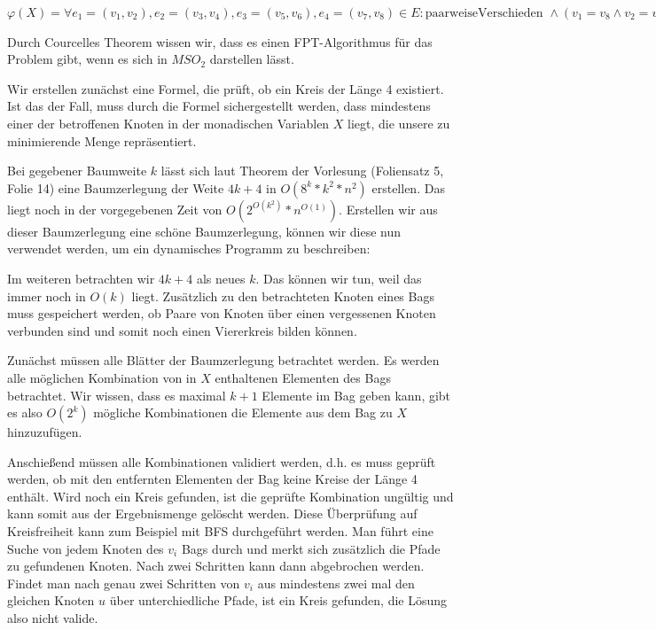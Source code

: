 

\DeclareMathOperator{\vc}{vc}





\subexercise

$\varphi(X) = \forall e_1 = (v_1, v_2), e_2 = (v_3, v_4), e_3 = (v_5, v_6), e_4 = (v_7, v_8) \in E \colon \text{paarweiseVerschieden } \wedge (v_1 = v_8 \wedge v_2 = v_3 \wedge v_4 = v_5 \wedge v_6 = v_7) \rightarrow (v_1, \dots, v_8) \cap X \neq \emptyset$

\how

Durch Courcelles Theorem wissen wir, dass es einen FPT-Algorithmus für das Problem gibt, wenn es sich in $MSO_2$ darstellen lässt.

Wir erstellen zunächst eine Formel, die prüft, ob ein Kreis der Länge 4 existiert. Ist das der Fall, muss durch die Formel sichergestellt werden, dass mindestens einer der betroffenen Knoten in der monadischen Variablen $X$ liegt, die unsere zu minimierende Menge repräsentiert.

\subexercise

Bei gegebener Baumweite $k$ lässt sich laut Theorem der Vorlesung (Foliensatz 5, Folie 14) eine Baumzerlegung der Weite $4k+4$ in $O(8^k*k^2*n^2)$ erstellen. Das liegt noch in der vorgegebenen Zeit von $O(2^{O(k^2)}*n^{O(1)})$. Erstellen wir aus dieser Baumzerlegung eine schöne Baumzerlegung, können wir diese nun verwendet werden, um ein dynamisches Programm zu beschreiben:

Im weiteren betrachten wir $4k+4$ als neues $k$. Das können wir tun, weil das immer noch in $O(k)$ liegt. Zusätzlich zu den betrachteten Knoten eines Bags muss gespeichert werden, ob Paare von Knoten über einen vergessenen Knoten verbunden sind und somit noch einen Viererkreis bilden können.

Zunächst müssen alle Blätter der Baumzerlegung betrachtet werden. Es werden alle möglichen Kombination von in $X$ enthaltenen Elementen des Bags betrachtet. Wir wissen, dass es maximal $k+1$ Elemente im Bag geben kann, gibt es also $O(2^k)$ mögliche Kombinationen die Elemente aus dem Bag zu $X$ hinzuzufügen.

Anschießend müssen alle Kombinationen validiert werden, d.h. es muss geprüft werden, ob mit den entfernten Elementen der Bag keine Kreise der Länge 4 enthält. Wird noch ein Kreis gefunden, ist die geprüfte Kombination ungültig und kann somit aus der Ergebnismenge gelöscht werden. Diese Überprüfung auf Kreisfreiheit kann zum Beispiel mit BFS durchgeführt werden. Man führt eine Suche von jedem Knoten des $v_i$ Bags durch und merkt sich zusätzlich die Pfade zu gefundenen Knoten. Nach zwei Schritten kann dann abgebrochen werden. Findet man nach genau zwei Schritten von $v_i$ aus mindestens zwei mal den gleichen Knoten $u$ über unterchiedliche Pfade, ist ein Kreis gefunden, die Lösung also nicht valide.

